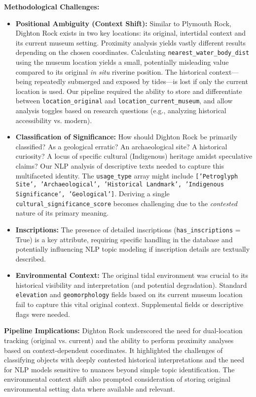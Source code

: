\textbf{Methodological Challenges:}
\begin{itemize}
    \item \textbf{Positional Ambiguity (Context Shift):} Similar to Plymouth Rock, Dighton Rock exists in two key locations: its original, intertidal context and its current museum setting. Proximity analysis yields vastly different results depending on the chosen coordinates. Calculating \texttt{nearest\_water\_body\_dist} using the museum location yields a small, potentially misleading value compared to its original \emph{in situ} riverine position. The historical context—being repeatedly submerged and exposed by tides—is lost if only the current location is used. Our pipeline required the ability to store and differentiate between \texttt{location\_original} and \texttt{location\_current\_museum}, and allow analysis toggles based on research questions (e.g., analyzing historical accessibility vs. modern).
    \item \textbf{Classification of Significance:} How should Dighton Rock be primarily classified? As a geological erratic? An archaeological site? A historical curiosity? A locus of specific cultural (Indigenous) heritage amidst speculative claims? Our NLP analysis of descriptive texts needed to capture this multifaceted identity. The \texttt{usage\_type} array might include \texttt{['Petroglyph Site', 'Archaeological', 'Historical Landmark', 'Indigenous Significance', 'Geological']}. Deriving a single \texttt{cultural\_significance\_score} becomes challenging due to the \emph{contested} nature of its primary meaning.
    \item \textbf{Inscriptions:} The presence of detailed inscriptions (\texttt{has\_inscriptions} = True) is a key attribute, requiring specific handling in the database and potentially influencing NLP topic modeling if inscription details are textually described.
    \item \textbf{Environmental Context:} The original tidal environment was crucial to its historical visibility and interpretation (and potential degradation). Standard \texttt{elevation} and \texttt{geomorphology} fields based on its current museum location fail to capture this vital original context. Supplemental fields or descriptive flags were needed.
\end{itemize}

\textbf{Pipeline Implications:} Dighton Rock underscored the need for dual-location tracking (original vs. current) and the ability to perform proximity analyses based on context-dependent coordinates. It highlighted the challenges of classifying objects with deeply contested historical interpretations and the need for NLP models sensitive to nuances beyond simple topic identification. The environmental context shift also prompted consideration of storing original environmental setting data where available and relevant.

